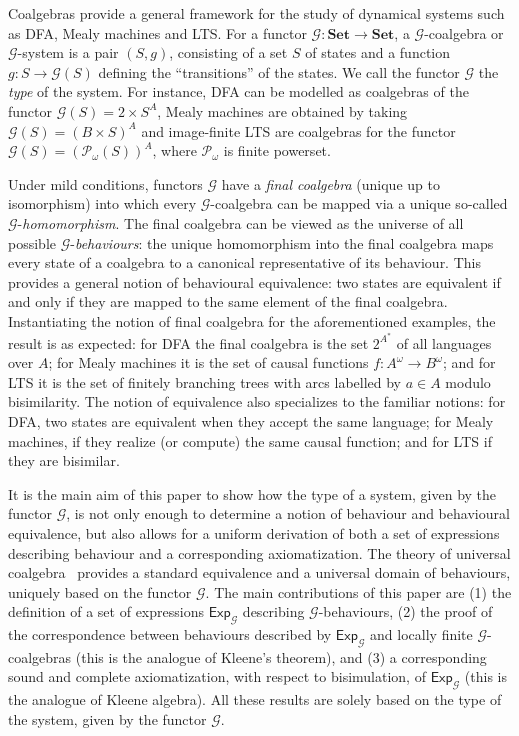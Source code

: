 \documentclass{LMCS}
\def\pow{{\mathcal P_{\!\!\!\omega}}}
\newcommand\Exp{\mathsf{Exp}}
\newcommand\G{\mathcal{G}}
\def\hyph{-\penalty0\hskip0pt\relax}
\theoremstyle{definition}
\theoremstyle{plain}
\theoremstyle{plain}
\theoremstyle{plain}
\theoremstyle{plain}
\theoremstyle{definition}
\theoremstyle{definition}
\begin{document}
Coalgebras provide a general framework for the study of dynamical
systems such as DFA, Mealy machines and LTS. For a functor
$\G\colon  \mathbf{Set}
\to \mathbf{Set}$, a $\G$-coalgebra or $\G$-system is a pair $(S,g)$,
consisting of a set $S$ of states and a function $g\colon S\to \G(S)$
defining the ``transitions'' of the states. We call the functor $\G$
the \emph{type} of the system. For instance, DFA can be modelled as
coalgebras of the functor $\G(S) = 2 \times
S^A$, Mealy machines are obtained by taking $\G(S) = (B\times S)^A$ and 
image-finite LTS are coalgebras for the functor $\G(S) = (\pow
(S))^A$, where $\pow$ is finite powerset.


Under mild conditions, functors $\G$ have a \emph{final coalgebra}
(unique up to isomorphism) into which every $\G$-coalgebra can be
mapped via a unique so-called $\G$\hyph\emph{homomorphism}. The final
coalgebra can be viewed as the universe of all possible
$\G$-\emph{behaviours}: the unique homomorphism into the final
coalgebra maps every state of a coalgebra to a canonical
representative of its behaviour. This provides a general notion of
behavioural equivalence: two states are equivalent if and only if they are
mapped to the same element of the final coalgebra. Instantiating the
notion of final coalgebra for the aforementioned examples, the result
is as expected: for DFA the final coalgebra is the set $2^{A^*}$ of all languages over $A$; for Mealy
machines it is the set of causal functions $f\colon A^\omega\to B^\omega$;
and for LTS it is the set of
finitely branching trees with arcs labelled by $a\in A$ modulo bisimilarity. The notion of
equivalence also specializes to the familiar notions: for DFA, two states are
equivalent when they accept the same language;
for Mealy machines, if they realize (or compute) the same causal function; and 
for LTS if they are bisimilar.

It is the main aim of this paper to show how the type of a system,
given by the functor $\G$, is not only enough to determine a notion of
behaviour and behavioural equivalence, but also allows for a uniform
derivation of both 
a set of expressions describing behaviour and a corresponding
axiomatization. The theory of universal coalgebra~\cite{Rutten00}
provides a standard equivalence and a universal domain of behaviours,
uniquely based on the functor $\G$. The main contributions of this
paper are (1) the definition of a set of expressions $\Exp_\G$
describing $\G$-behaviours, (2) the proof of the correspondence between
behaviours described by $\Exp_\G$ and locally finite $\G$-coalgebras (this is the analogue of Kleene's theorem),  and (3) a corresponding sound and complete
axiomatization, with respect to bisimulation, of $\Exp_\G$ (this is the analogue of
Kleene algebra). All these results are solely based on the type of
the system, given by the functor $\G$. 
\end{document}
